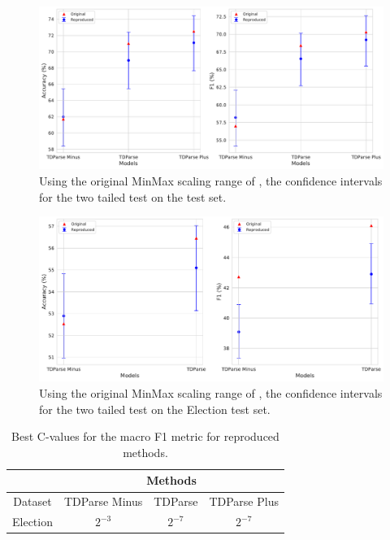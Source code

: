  \FloatBarrier
 \begin{figure}[!h]
    \centering
    \includegraphics[scale=0.37]{images/reproducibility/wang/TDParse_alt_scale_Dong.pdf}
    \caption{Using the original MinMax scaling range of \citet{wang-etal-2017-tdparse}, the confidence intervals for the two tailed test on the \citet{dong-etal-2014-adaptive} test set.}
    \label{fig:repro_wang_TDParse_alt_scale_Dong}
\end{figure}
\begin{figure}[!h]
    \centering
    \includegraphics[scale=0.37]{images/reproducibility/wang/TDParse_alt_scale_Election.pdf}
    \caption{Using the original MinMax scaling range of \citet{wang-etal-2017-tdparse}, the confidence intervals for the two tailed test on the \citet{wang-etal-2017-tdparse} Election test set.}
    \label{fig:repro_wang_TDParse_alt_scale_Election}
\end{figure}

\begin{table}[h!]
    \centering
    \begin{tabular}{|c|c|c|c|}
        \hline
         & \multicolumn{3}{c|}{Methods} \\
        \hline
        Dataset & TDParse Minus & TDParse & TDParse Plus \\
        \hline
        Election & $2^{-3}$ & $2^{-7}$ & $2^{-7}$ \\
        \hline
    \end{tabular}
    \caption{Best C-values for the macro F1 metric for \citet{wang-etal-2017-tdparse} reproduced methods.}
    \label{table:repro_rep_wang_c_macro_f1}
\end{table}


